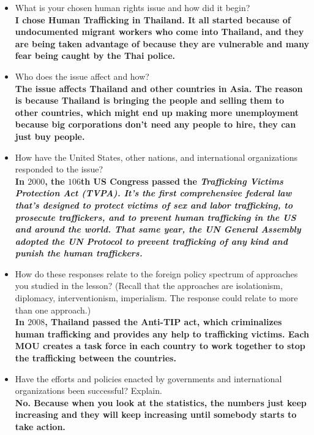 \begin{itemize}
  \item What is your chosen human rights issue and how did it begin? \\
      \bf{I chose Human Trafficking in Thailand. It all started because of
      undocumented migrant workers who come into Thailand, and they are being
      taken advantage of because they are vulnerable and many fear being caught
      by the Thai police.}
  \item Who does the issue affect and how? \\
      \bf{The issue affects Thailand and other countries in Asia. The reason is
      because Thailand is bringing the people and selling them to other countries,
      which might end up making more unemployment because big corporations don't
      need any people to hire, they can just buy people.}
  \item How have the United States, other nations, and international
    organizations responded to the issue? \\
      \bf{In $2000$, the $106$th US Congress passed the \it{Trafficking Victims
      Protection Act (TVPA)}. It's the first comprehensive federal law that's
      designed to protect victims of sex and labor trafficking, to prosecute
      traffickers, and to prevent human trafficking in the US and around the
      world. That same year, the UN General Assembly adopted the UN Protocol to
      prevent trafficking of any kind and punish the human traffickers.}
  \item How do these responses relate to the foreign policy spectrum of
    approaches you studied in the lesson? (Recall that the approaches are
    isolationism, diplomacy, interventionism, imperialism. The response could
      relate to more than one approach.) \\
      \bf{In $2008$, Thailand passed the Anti-TIP act, which criminalizes human
      trafficking and provides any help to trafficking victims. Each MOU creates
      a task force in each country to work together to stop the trafficking
      between the countries.}
  \item Have the efforts and policies enacted by governments and international
    organizations been successful? Explain. \\
      \bf{No. Because when you look at the statistics, the numbers just keep
      increasing and they will keep increasing until somebody starts to take
      action.}
\end{itemize}
